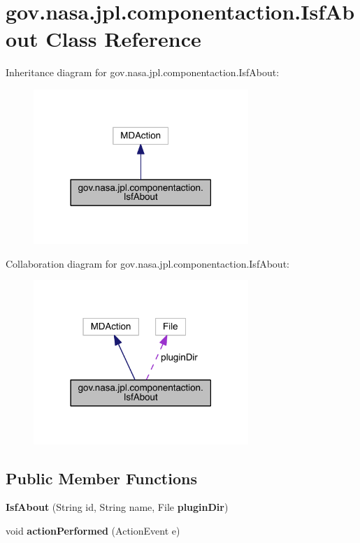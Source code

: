 \section{gov.\+nasa.\+jpl.\+componentaction.\+Isf\+About Class Reference}
\label{classgov_1_1nasa_1_1jpl_1_1componentaction_1_1_isf_about}


Inheritance diagram for gov.\+nasa.\+jpl.\+componentaction.\+Isf\+About\+:
\nopagebreak
\begin{figure}[H]
\begin{center}
\leavevmode
\includegraphics[width=230pt]{classgov_1_1nasa_1_1jpl_1_1componentaction_1_1_isf_about__inherit__graph}
\end{center}
\end{figure}


Collaboration diagram for gov.\+nasa.\+jpl.\+componentaction.\+Isf\+About\+:
\nopagebreak
\begin{figure}[H]
\begin{center}
\leavevmode
\includegraphics[width=230pt]{classgov_1_1nasa_1_1jpl_1_1componentaction_1_1_isf_about__coll__graph}
\end{center}
\end{figure}
\subsection*{Public Member Functions}
\begin{DoxyCompactItemize}
\item 
{\bf Isf\+About} (String id, String name, File {\bf plugin\+Dir})
\item 
void {\bf action\+Performed} (Action\+Event e)
\end{DoxyCompactItemize}
